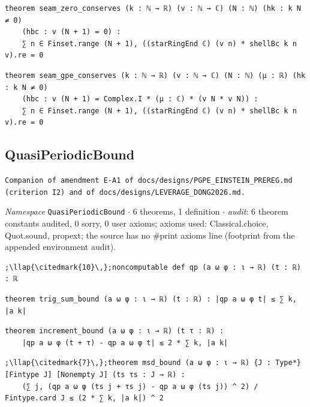 \begin{lstlisting}[style=leancat]
theorem seam_zero_conserves (k : ℕ → ℝ) (v : ℕ → ℂ) (N : ℕ) (hk : k N ≠ 0)
    (hbc : v (N + 1) = 0) :
    ∑ n ∈ Finset.range (N + 1), ((starRingEnd ℂ) (v n) * shellBc k n v).re = 0
\end{lstlisting}

\begin{lstlisting}[style=leancat]
theorem seam_gpe_conserves (k : ℕ → ℝ) (v : ℕ → ℂ) (N : ℕ) (μ : ℝ) (hk : k N ≠ 0)
    (hbc : v (N + 1) = Complex.I * (μ : ℂ) * (v N * v N)) :
    ∑ n ∈ Finset.range (N + 1), ((starRingEnd ℂ) (v n) * shellBc k n v).re = 0
\end{lstlisting}

\subsection{QuasiPeriodicBound}\label{appA:QuasiPeriodicBound}
{\footnotesize\raggedright\texttt{Companion of amendment E-\allowbreak{}A1 of docs/\allowbreak{}designs/\allowbreak{}PGPE\_\allowbreak{}EINSTEIN\_\allowbreak{}PREREG.\allowbreak{}md (criterion I2) and of docs/\allowbreak{}designs/\allowbreak{}LEVERAGE\_\allowbreak{}DONG2026.\allowbreak{}md.\allowbreak{}}\par}
{\footnotesize\raggedright\emph{Namespace} \texttt{QuasiPeriodicBound} $\cdot$ 6 theorems, 1 definition $\cdot$ \emph{audit}: 6 theorem constants audited, 0 sorry, 0 user axioms; axioms used: Classical.choice, Quot.sound, propext; the source has no \#print axioms line (footprint from the appended environment audit).\par}
\vspace{1pt}
\begin{lstlisting}[style=leancat]
;\llap{\citedmark{10}\,};noncomputable def qp (a ω φ : ι → ℝ) (t : ℝ) : ℝ
\end{lstlisting}

\begin{lstlisting}[style=leancat]
theorem trig_sum_bound (a ω φ : ι → ℝ) (t : ℝ) : |qp a ω φ t| ≤ ∑ k, |a k|
\end{lstlisting}

\begin{lstlisting}[style=leancat]
theorem increment_bound (a ω φ : ι → ℝ) (t τ : ℝ) :
    |qp a ω φ (t + τ) - qp a ω φ t| ≤ 2 * ∑ k, |a k|
\end{lstlisting}

\begin{lstlisting}[style=leancat]
;\llap{\citedmark{7}\,};theorem msd_bound (a ω φ : ι → ℝ) {J : Type*} [Fintype J] [Nonempty J] (ts τs : J → ℝ) :
    (∑ j, (qp a ω φ (ts j + τs j) - qp a ω φ (ts j)) ^ 2) / Fintype.card J ≤ (2 * ∑ k, |a k|) ^ 2
\end{lstlisting}

